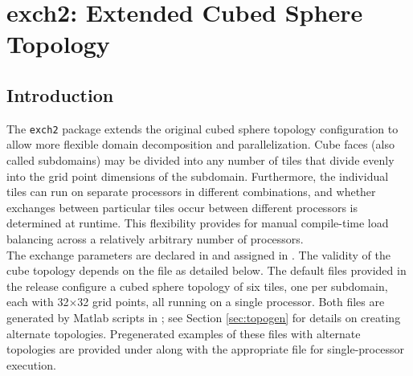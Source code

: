 


\section{exch2: Extended Cubed Sphere \mbox{Topology}}
\label{sec:exch2}


\subsection{Introduction}

The \texttt{exch2} package extends the original cubed
sphere topology configuration to allow more flexible domain
decomposition and parallelization.  Cube faces (also called
subdomains) may be divided into any number of tiles that divide evenly
into the grid point dimensions of the subdomain.  Furthermore, the
individual tiles can run on separate processors in different
combinations, and whether exchanges between particular tiles occur
between different processors is determined at runtime.  This
flexibility provides for manual compile-time load balancing across a
relatively arbitrary number of processors. \\

The exchange parameters are declared in
and assigned in
. The
validity of the cube topology depends on the  file as
detailed below.  The default files provided in the release configure a
cubed sphere topology of six tiles, one per subdomain, each with
32$\times$32 grid points, all running on a single processor.  Both
files are generated by Matlab scripts in
; see Section
\ref{sec:topogen} 
for details on creating alternate topologies.  Pregenerated examples
of these files with alternate topologies are provided under
 along with the appropriate 
file for single-processor execution.

